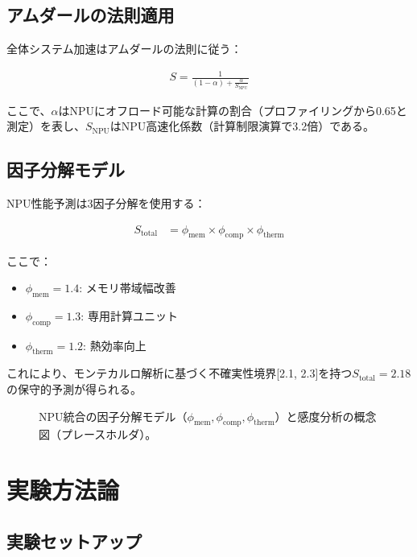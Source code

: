 \documentclass[10pt,twocolumn,a4paper]{jarticle}
\begin{document}
\subsection{アムダールの法則適用}

全体システム加速はアムダールの法則に従う：

\begin{align}
S = \frac{1}{(1-\alpha) + \frac{\alpha}{S_{\text{NPU}}}} \label{eq:amdahl}
\end{align}

ここで、$\alpha$はNPUにオフロード可能な計算の割合（プロファイリングから0.65と測定）を表し、$S_{\text{NPU}}$はNPU高速化係数（計算制限演算で3.2倍）である。

\subsection{因子分解モデル}

NPU性能予測は3因子分解を使用する：

\begin{align}
S_{\text{total}} &= \phi_{\text{mem}} \times \phi_{\text{comp}} \times \phi_{\text{therm}} \label{eq:factors}
\end{align}

ここで：
\begin{itemize}
\item $\phi_{\text{mem}} = 1.4$: メモリ帯域幅改善
\item $\phi_{\text{comp}} = 1.3$: 専用計算ユニット
\item $\phi_{\text{therm}} = 1.2$: 熱効率向上
\end{itemize}

これにより、モンテカルロ解析に基づく不確実性境界[2.1, 2.3]を持つ$S_{\text{total}} = 2.18$の保守的予測が得られる。

\begin{figure}[t]
  \centering
  \fbox{\rule{0pt}{40mm}\rule{0.95\columnwidth}{0pt}}
  \caption{NPU統合の因子分解モデル（$\phi_{\text{mem}}, \phi_{\text{comp}}, \phi_{\text{therm}}$）と感度分析の概念図（プレースホルダ）。}
  \label{fig:npu_prediction}
\end{figure}

\section{実験方法論}

\subsection{実験セットアップ}
\end{document}
